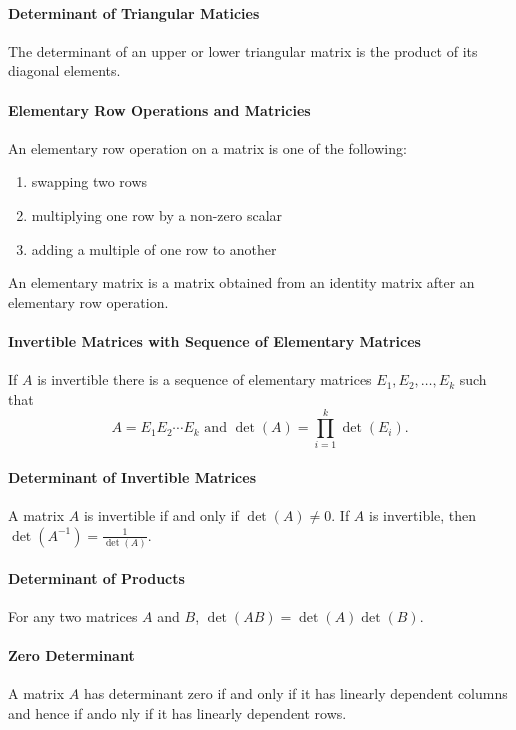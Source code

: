 \paragraph{Determinant of Triangular Maticies}
The determinant of an upper or lower triangular matrix is the product of its diagonal elements.

\paragraph{Elementary Row Operations and Matricies}
An elementary row operation on a matrix is one of the following:
\begin{enumerate}
    \item swapping two rows
    \item multiplying one row by a non-zero scalar
    \item adding a multiple of one row to another
\end{enumerate}
An elementary matrix is a matrix obtained from an identity matrix after an elementary row operation.

\paragraph{Invertible Matrices with Sequence of Elementary Matrices}
If \(A\) is invertible there is a sequence of elementary matrices \(E_1, E_2, \dots, E_k\) such that
\[A = E_1E_2\cdots E_k \text { and } \det(A) = \prod_{i=1}^k \det(E_i).\]

\paragraph{Determinant of Invertible Matrices}
A matrix \(A\) is invertible if and only if \(\det(A) \neq 0\).
If \(A\) is invertible, then \(\det(A^{-1}) = \frac{1}{\det(A)}\).

\paragraph{Determinant of Products}
For any two matrices \(A\) and \(B\), \(\det(AB) = \det(A)\det(B)\).

\paragraph{Zero Determinant}
A matrix \(A\) has determinant zero if and only if it has linearly dependent columns and hence if ando nly if it has linearly dependent rows.

